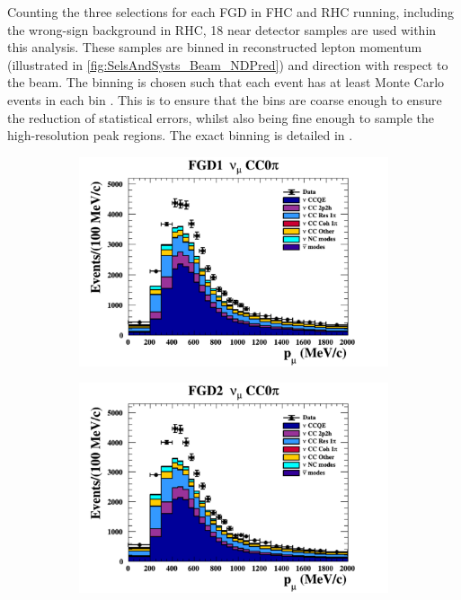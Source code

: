 Counting the three selections for each FGD in FHC and RHC running, including the wrong-sign background in RHC, 18 near detector samples are used within this analysis. These samples are binned in reconstructed lepton momentum (illustrated in \autoref{fig:SelsAndSysts_Beam_NDPred}) and direction with respect to the beam. The binning is chosen such that each event has at least  Monte Carlo events in each bin \cite{thesis_will}. This is to ensure that the bins are coarse enough to ensure the reduction of statistical errors, whilst also being fine enough to sample the high-resolution peak regions. The exact binning is detailed in \cite{thesis_will}.

\begin{figure}[h]
  \begin{subfigure}[t]{0.49\textwidth}
    \includegraphics[width=\textwidth, trim={0mm 0mm 0mm 0mm}, clip,page=1]{Figures/Selections/Pmu_1D_modes_FGD1_numuCC_0pi_Data_prefit.pdf}
  \end{subfigure}%
  \begin{subfigure}[t]{0.49\textwidth}
    \includegraphics[width=\textwidth, trim={0mm 0mm 0mm 0mm}, clip,page=1]{Figures/Selections/Pmu_1D_modes_FGD2_numuCC_0pi_Data_prefit.pdf}

\end{subfigure}
\end{figure}
